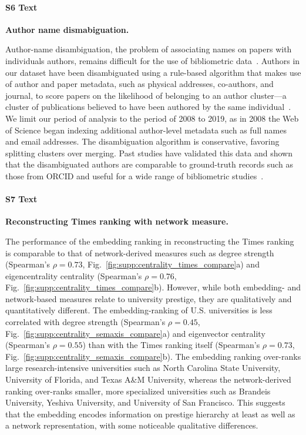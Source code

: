 \documentclass[12pt]{article} %
\begin{document}
%
\paragraph*{S6 Text}
\label{si:text:disambiguation}
{\bf Author name dismabiguation.}

Author-name disambiguation, the problem of associating names on papers with individuals authors, remains difficult for the use of bibliometric data~\autocite{dangelo2020disambiguation}.
Authors in our dataset have been disambiguated using a rule-based algorithm that makes use of author and paper metadata, such as physical addresses, co-authors, and journal, to score papers on the likelihood of belonging to an author cluster---a cluster of publications believed to have been authored by the same individual~\autocite{caron2014disambiguation}.
We limit our period of analysis to the period of 2008 to 2019, as in 2008 the Web of Science began indexing additional author-level metadata such as full names and email addresses.
The disambiguation algorithm is conservative, favoring splitting clusters over merging.
Past studies have validated this data and shown that the disambiguated authors are comparable to ground-truth records such as those from ORCID and useful for a wide range of bibliometric studies~\autocite{sugimoto2017mostimpact, robinson2019mobility, chinchilla2018global, chinchilla2018travelban}.



%
\paragraph*{S7 Text}
\label{si:text:network_ranking}
{\bf Reconstructing Times ranking with network measure.}

The performance of the embedding ranking in reconstructing the Times ranking is comparable to that of network-derived measures such as degree strength (Spearman's $\rho = 0.73$, Fig.~\ref{fig:supp:centrality_times_compare}a) and eigencentrality centrality (Spearman's $\rho = 0.76$, Fig.~\ref{fig:supp:centrality_times_compare}b).
However, while both embedding- and network-based measures relate to university prestige, they are qualitatively and quantitatively different.
The embedding-ranking of U.S. universities is less correlated with degree strength (Spearman's $\rho = 0.45$, Fig.~\ref{fig:supp:centrality_semaxis_compare}a) and eigenvector  centrality (Spearman's $\rho = 0.55$) than with the Times ranking itself (Spearman's $\rho = 0.73$, Fig.~\ref{fig:supp:centrality_semaxis_compare}b). 
The embedding ranking over-ranks large research-intensive universities such as North Carolina State University, University of Florida, and Texas A\&M University, whereas the network-derived ranking over-ranks smaller, more specialized universities such as Brandeis University, Yeshiva University, and University of San Francisco. 
This suggests that the embedding encodes information on prestige hierarchy at least as well as a network representation, with some noticeable qualitative differences.
\end{document}
